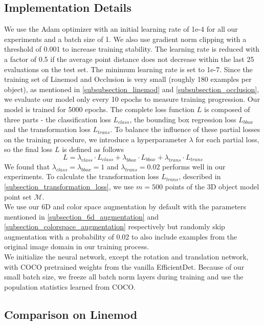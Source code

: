 \documentclass[twocolumn, 10pt, letterpaper]{article}
\begin{document}
\subsection{Implementation Details}
\label{subsection_implementation_details}
We use the Adam optimizer\cite{Adam} with an initial learning rate of 1e-4 for all our experiments and a batch size of 1. We also use gradient norm clipping with a threshold of 0.001 to increase training stability. The learning rate is reduced with a factor of 0.5 if the average point distance does not decrease within the last 25 evaluations on the test set. The minimum learning rate is set to 1e-7. Since the training set of Linemod and Occlusion is very small (roughly 180 examples per object), as mentioned in \autoref{subsubsection_linemod} and \autoref{subsubsection_occlusion}, we evaluate our model only every 10 epochs to measure training progression. Our model is trained for 5000 epochs. The complete loss function $L$ is composed of three parts - the classification loss $L_{class}$, the bounding box regression loss $L_{bbox}$ and the transformation loss $L_{trans}$. To balance the influence of these partial losses on the training procedure, we introduce a hyperparameter $\lambda$ for each partial loss, so the final loss $L$ is defined as follows
\begin{equation}
\label{equation_complete_loss}
L = \lambda_{class} \cdot L_{class} + \lambda_{bbox} \cdot L_{bbox} + \lambda_{trans} \cdot L_{trans}
\end{equation}
We found that $\lambda_{class} = \lambda_{bbox} = 1$ and $\lambda_{trans} = 0.02$ performs well in our experiments. To calculate the transformation loss $L_{trans}$, described in \autoref{subsection_transformation_loss}, we use $m = 500$ points of the 3D object model point set $\mathcal{M}$.\\
We use our 6D and color space augmentation by default with the parameters mentioned in \autoref{subsection_6d_augmentation} and \autoref{subsection_colorspace_augmentation} respectively but randomly skip augmentation with a probability of 0.02 to also include examples from the original image domain in our training process.\\
We initialize the neural network, except the rotation and translation network, with COCO\cite{COCO} pretrained weights from the vanilla EfficientDet\cite{EfficientDet}. Because of our small batch size, we freeze all batch norm layers during training and use the population statistics learned from COCO.

\subsection{Comparison on Linemod}
\label{subsection_comparison_linemod}
\end{document}
